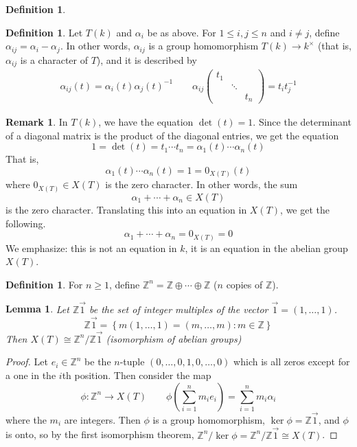 \documentclass[12pt]{article}
\newtheorem{lemma}[theorem]{Lemma}
\theoremstyle{definition}
\newtheorem{definition}[theorem]{Definition}
\newtheorem{remark}[theorem]{Remark}
\numberwithin{theorem}{subsection}
\newcommand{\Z}{\mathbb{Z}}
\newcommand{\lp}{\left(}
\newcommand{\rp}{\right)}
\newcommand{\lb}{\left\{}
\newcommand{\rb}{\right\}}
\newcommand{\inv}{^{-1}}
\newcommand{\iso}{\cong}
\begin{document}
\begin{definition}
\begin{definition}
Let $T(k)$ and $\alpha_i$ be as above. For $1 \le i,j \le n$ and $i \neq j$, define $\alpha_{ij} = \alpha_i - \alpha_j$. In other words, $\alpha_{ij}$ is a group homomorphism $T(k) \to k^\times$ (that is, $\alpha_{ij}$ is a character of $T$), and it is described by
\begin{align*}
	\alpha_{ij}(t) = \alpha_i(t) \alpha_j(t) \inv \qquad
	\alpha_{ij}
	\begin{pmatrix}
		t_1 \\
		& \ddots \\
		&& t_n
	\end{pmatrix} = t_i t_j \inv
\end{align*}
\end{definition}

\begin{remark}
In $T(k)$, we have the equation $\det(t) = 1$. Since the determinant of a diagonal matrix is the product of the diagonal entries, we get the equation
\[
	1 = \det(t) = t_1 \cdots t_n = \alpha_1(t) \cdots \alpha_n(t)
\]
That is,
\[
	\alpha_1(t) \cdots \alpha_n(t) = 1 = 0_{X(T)}(t)
\]
where $0_{X(T)} \in X(T)$ is the zero character. In other words, the sum
\[
	\alpha_1 + \cdots + \alpha_n \in X(T)
\]
is the zero character. Translating this into an equation in $X(T)$, we get the following.
\[
	\alpha_1 + \cdots + \alpha_n = 0_{X(T)} = 0
\]
We emphasize: this is not an equation in $k$, it is an equation in the abelian group $X(T)$.
\end{remark}

\begin{definition}
For $n \ge 1$, define $\Z^n = \Z \oplus \cdots \oplus \Z$ ($n$ copies of $\Z$).
\end{definition}

\begin{lemma}
Let $\Z \vec 1$ be the set of integer multiples of the vector $\vec 1 = (1, \ldots, 1)$.
\[
	\Z \vec 1 = \lb m(1, \ldots, 1) = (m, \ldots, m) : m \in \Z \rb
\]
Then $X(T) \iso \Z^n / \Z \vec 1$ (isomorphism of abelian groups)
\end{lemma}
\begin{proof}
Let $e_i \in \Z^{n}$ be the $n$-tuple $(0, \ldots, 0, 1, 0, \ldots, 0)$ which is all zeros except for a one in the $i$th position. Then consider the map
\[
	\phi:\Z^n \to X(T) \qquad \phi \lp \sum_{i=1}^n m_i e_i \rp = \sum_{i=1}^n m_i \alpha_i
\]
where the $m_i$ are integers. Then $\phi$ is a group homomorphism, $\ker \phi = \Z \vec 1$, and $\phi$ is onto, so by the first isomorphism theorem, $\Z^n / \ker \phi = \Z^n / \Z \vec 1 \iso X(T)$.
\end{proof}


\end{definition}
\end{document}
